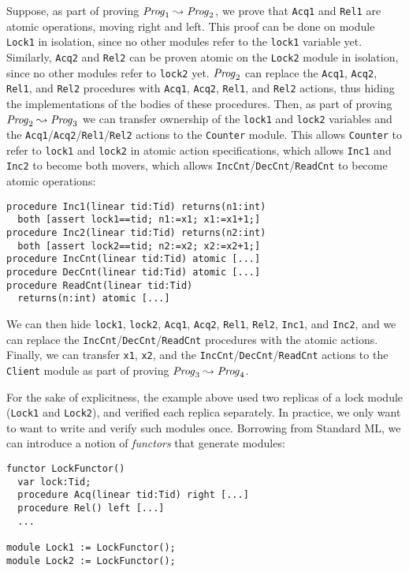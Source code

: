 Suppose, as part of proving $\mathit{Prog}_1 \leadsto \mathit{Prog}_2$, we prove that \verb`Acq1` and \verb`Rel1` are atomic operations, moving right and left.
This proof can be done on module \verb`Lock1` in isolation, since no other modules refer to the \verb`lock1` variable yet.
Similarly, \verb`Acq2` and \verb`Rel2` can be proven atomic on the \verb`Lock2` module in isolation, since no other modules refer to \verb`lock2` yet.
$\mathit{Prog}_2$ can replace the \verb`Acq1`, \verb`Acq2`, \verb`Rel1`, and \verb`Rel2` procedures with \verb`Acq1`, \verb`Acq2`, \verb`Rel1`, and \verb`Rel2` actions,
thus hiding the implementations of the bodies of these procedures.
Then, as part of proving $\mathit{Prog}_2 \leadsto \mathit{Prog}_3$ we can transfer ownership of the \verb`lock1` and \verb`lock2` variables and the \verb`Acq1`/\verb`Acq2`/\verb`Rel1`/\verb`Rel2` actions to the \verb`Counter` module.
This allows \verb`Counter` to refer to \verb`lock1` and \verb`lock2` in atomic action specifications,
which allows \verb`Inc1` and \verb`Inc2` to become both movers, which allows \verb`IncCnt`/\verb`DecCnt`/\verb`ReadCnt` to become atomic operations:

\begin{verbatim}
procedure Inc1(linear tid:Tid) returns(n1:int)
  both [assert lock1==tid; n1:=x1; x1:=x1+1;]
procedure Inc2(linear tid:Tid) returns(n2:int)
  both [assert lock2==tid; n2:=x2; x2:=x2+1;]
procedure IncCnt(linear tid:Tid) atomic [...]
procedure DecCnt(linear tid:Tid) atomic [...]
procedure ReadCnt(linear tid:Tid)
  returns(n:int) atomic [...]
\end{verbatim}

We can then hide \verb`lock1`, \verb`lock2`, \verb`Acq1`, \verb`Acq2`, \verb`Rel1`, \verb`Rel2`, \verb`Inc1`, and \verb`Inc2`,
and we can replace the \verb`IncCnt`/\verb`DecCnt`/\verb`ReadCnt` procedures with the atomic actions.
Finally, we can transfer \verb`x1`, \verb`x2`, and the \verb`IncCnt`/\verb`DecCnt`/\verb`ReadCnt` actions to the \verb`Client` module as part of proving $\mathit{Prog}_3 \leadsto \mathit{Prog}_4$.

For the sake of explicitness, the example above used two replicas of a lock module (\verb`Lock1` and \verb`Lock2`), and verified each replica separately.
In practice, we only want to want to write and verify such modules once.
Borrowing from Standard ML, we can introduce a notion of {\it functors} that generate modules:

\begin{verbatim}
functor LockFunctor()
  var lock:Tid;
  procedure Acq(linear tid:Tid) right [...]
  procedure Rel() left [...]
  ...

module Lock1 := LockFunctor();
module Lock2 := LockFunctor();
\end{verbatim}

